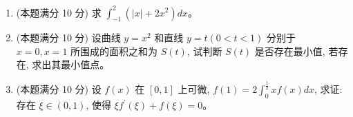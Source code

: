 \begin{enumerate}
{\begin{enumerate}
	\item
	\textbf{B}。$L_1$ 的方向为 $\bm{s}_1=(0,1,1)$，$L_2$ 的方向为 $\bm{s}_2=(1,2,1)$。
	平面与两者都平行，故法向量
	\[
	\bm{n}=\bm{s}_1\times\bm{s}_2=
	\begin{vmatrix}\bm{i}&\bm{j}&\bm{k}\\0&1&1\\1&2&1\end{vmatrix}=(-1,\ 1,\ -1).
	\]
	又平面过原点，故方程为 $-x+y-z=0$，即 $x-y+z=0$。

	\item
	\textbf{C}。$x^2$ 是偶函数，其在 $[-\pi,\pi]$ 上的余弦展开为
	\[
	x^{2}=\frac{\pi^{2}}{3}+\sum_{n=1}^{\infty}\frac{4(-1)^{n}}{n^{2}}\cos nx ,
	\]
	其中 $n\geqslant1$ 时
	$\frac{2}{\pi}\int_0^{\pi}x^{2}\cos nx\,dx=\frac{2}{\pi}\cdot\frac{2\pi(-1)^{n}}{n^{2}}
	=\frac{4(-1)^{n}}{n^{2}}$。
	题中把常数项也记作 $a_0$，故对 $n\geqslant1$ 有 $a_n=\frac{4(-1)^{n}}{n^{2}}$，于是
	$a_2=\frac{4}{4}=1$。
\end{enumerate}
}



\item 
(本题满分 10 分)
求 $\int_{-1}^{2}\left(|x|+2 x^{2}\right) d x$。


\item 
(本题满分 10 分)
设曲线 $y=x^{2}$ 和直线 $y=t(0<t<1)$ 分别于 $x=0, x=1$ 所围成的面积之和为 $S(t)$, 试判断 $S(t)$ 是否存在最小值, 若存在, 求出其最小值点。



\item 
(本题满分 10 分)
设 $f(x)$ 在 $[0,1]$ 上可微, $f(1)=2 \int_{0}^{\frac{1}{2}} x f(x) d x$, 求证:
 存在 $\xi \in(0,1)$, 使得 $\xi f^{\prime}(\xi)+f(\xi)=0$。


\end{enumerate}
